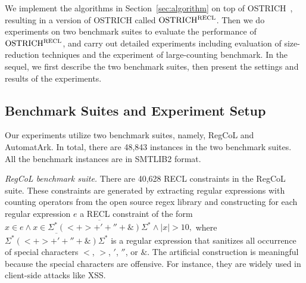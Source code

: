 %

We implement the algorithms in Section~\ref{sec:algorithm} on top of OSTRICH~\cite{Ostrich,atva2020}, resulting in a version of OSTRICH called $\rm OSTRICH^{RECL}$.
Then we do experiments on two benchmark suites to evaluate the performance of $\rm OSTRICH^{RECL}$, and carry out detailed experiments including evaluation of size-reduction techniques and the experiment of large-counting benchmark. In the sequel, we first describe the two benchmark suites, then present the settings and results of the experiments.


\vspace{-3mm}
\subsection{Benchmark Suites and Experiment Setup}\label{sec:bench}
\vspace{-2mm}

Our experiments utilize two benchmark suites, namely, RegCoL and AutomatArk. In total, there are 48,843 instances in the two benchmark suites. All the benchmark instances are in SMTLIB2 format.

\medskip
\noindent
\emph{RegCoL benchmark suite.} There are 40,628 RECL constraints in the RegCoL suite. These constraints are generated by extracting regular expressions with counting operators from the open source regex library \cite{regex_lingua_franca,redos_lenka} and constructing for each regular expression $e$ a RECL constraint of the form
$x \in e \wedge x \in \overline{\Sigma^*(<+ >+'+''+\&)\Sigma^*} \wedge |x| > 10,$
where $\overline{\Sigma^*(<+ >+'+''+\&)\Sigma^*}$ is a regular expression that sanitizes all occurrence of special characters $<$, $>$, $'$, $''$, or $\&$. The artificial construction is meaningful because the special characters are offensive. For instance, they are widely used in client-side attacks like XSS\cite{malware_detection_3_kudzu}\cite{CCH+18}.

